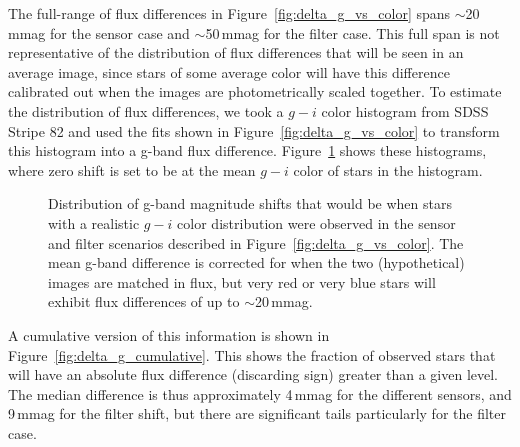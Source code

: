 \documentclass[DM,toc]{lsstdoc}
\begin{document}
The full-range of flux differences in Figure~\ref{fig:delta_g_vs_color} spans
$\sim$20\,mmag for the sensor case and $\sim$50\,mmag for the filter case. This
full span is not representative of the distribution of flux differences that
will be seen in an average image, since stars of some average color will have
this difference calibrated out when the images are photometrically scaled
together. To estimate the distribution of flux differences, we took a $g-i$
color histogram from SDSS Stripe 82 and used the fits shown in
Figure~\ref{fig:delta_g_vs_color} to transform this histogram into a g-band flux
difference. Figure~\ref{fig:delta_g_histogram} shows these histograms, where zero
shift is set to be at the mean $g-i$ color of stars in the histogram.

\begin{figure}
\caption{Distribution of g-band magnitude shifts that would be when stars with a
realistic $g-i$ color distribution were observed in the sensor and filter
scenarios described in Figure~\ref{fig:delta_g_vs_color}. The mean g-band
difference is corrected for when the two (hypothetical) images are matched in flux,
but very red or very blue stars will exhibit flux differences of up to $\sim$20\,mmag.
\label{fig:delta_g_histogram}}
\end{figure}

A cumulative version of this information is shown in
Figure~\ref{fig:delta_g_cumulative}. This shows the fraction of observed
stars that will have an absolute flux difference (discarding sign) greater than
a given level. The median difference is thus approximately 4\,mmag for the
different sensors, and 9\,mmag for the filter shift, but there are significant
tails particularly for the filter case.
\end{document}
